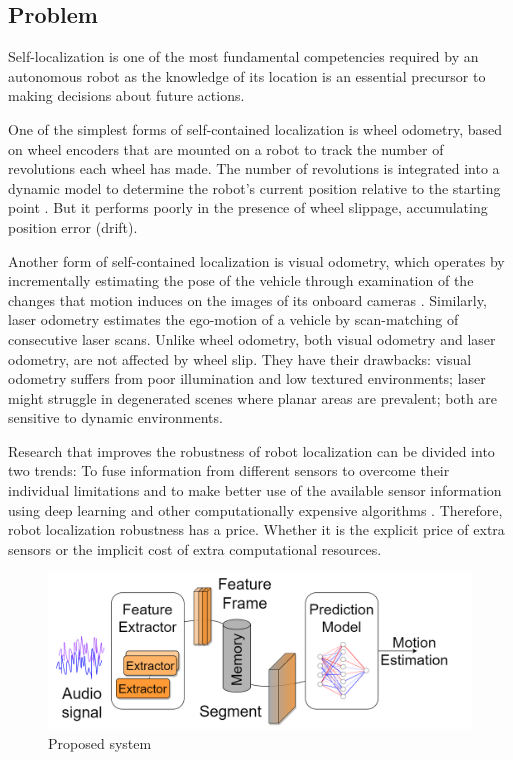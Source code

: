 \subsection{Problem} \label{subsec:problem}


Self-localization is one of the most fundamental competencies required by an
autonomous robot as the knowledge of its location is an essential precursor to
making decisions about future actions.

One of the simplest forms of self-contained localization is wheel odometry,
based on wheel encoders that are mounted on a robot to track the number of
revolutions each wheel has made. The number of revolutions is integrated into a
dynamic model to determine the robot's current position relative to the
starting point \cite{OdometrySurvey}. But it performs poorly in the presence of
wheel slippage, accumulating position error (drift).

Another form of self-contained localization is visual odometry, which operates
by incrementally estimating the pose of the vehicle through examination of the
changes that motion induces on the images of its onboard cameras
\cite{ScaramuzzaTutorial}. Similarly, laser odometry estimates the ego-motion
of a vehicle by scan-matching of consecutive laser scans. Unlike wheel
odometry, both visual odometry and laser odometry, are not affected by wheel
slip. They have their drawbacks: visual odometry suffers from poor illumination
and low textured environments; laser might struggle in degenerated scenes where
planar areas are prevalent; both are sensitive to dynamic environments.

Research that improves the robustness of robot localization can be divided into
two trends: To fuse information from different sensors to overcome their
individual limitations \cite{Valente2019,Vargas2021,Ojeda2006} and to make
better use of the available sensor information using deep learning and other
computationally expensive algorithms \cite{Long2021,DFVO}. Therefore, robot
localization robustness has a price. Whether it is the explicit price of extra
sensors or the implicit cost of extra computational resources.

\begin{figure}[t]
    \centering
    \includegraphics[width=\linewidth]{content/system.drawio.png}
    \caption{Proposed system}
    \label{fig:system}
\end{figure}

